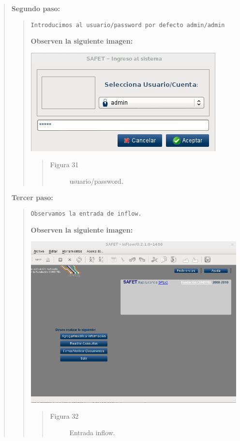 \documentclass[letterpaper,11pt,spanish]{sphinxmanual}
\begin{document}
\begin{quote}
\textbf{Segundo paso:}
\begin{quote}

\begin{Verbatim}[commandchars=\\\{\}]
Introducimos al usuario/password por defecto admin/admin
\end{Verbatim}

\textbf{Observen la siguiente imagen:}

\includegraphics{inflow6.png}
\begin{quote}\begin{description}
\item[{Figura 31}] \leavevmode
usuario/password.

\end{description}\end{quote}
\end{quote}

\textbf{Tercer paso:}
\begin{quote}

\begin{Verbatim}[commandchars=\\\{\}]
Observamos la entrada de inflow.
\end{Verbatim}

\textbf{Observen la siguiente imagen:}

\includegraphics{inflow7.png}
\begin{quote}\begin{description}
\item[{Figura 32}] \leavevmode
Entrada inflow.


\end{description}
\end{quote}
\end{quote}
\end{quote}
\end{document}
